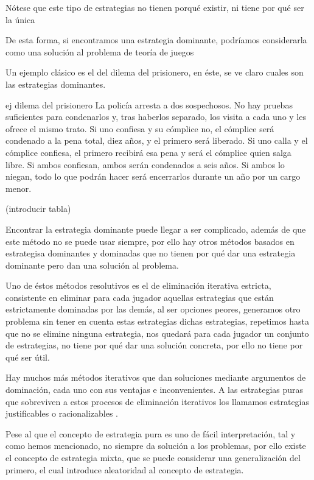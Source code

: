 \documentclass[a4paper]{report} %
\begin{document}
Nótese que este tipo de estrategias no tienen porqué existir, ni tiene por qué ser la única

De esta forma, si encontramos una estrategia dominante, podríamos considerarla como una solución al problema de teoría de juegos

Un ejemplo clásico es el del dilema del prisionero, en éste, se ve claro cuales son las estrategias dominantes.

ej dilema del prisionero
La policía arresta a dos sospechosos. No hay pruebas suficientes para condenarlos y, tras haberlos separado, los visita a cada uno y les ofrece el mismo trato. Si uno confiesa y su cómplice no, el cómplice será condenado a la pena total, diez años, y el primero será liberado. Si uno calla y el cómplice confiesa, el primero recibirá esa pena y será el cómplice quien salga libre. Si ambos confiesan, ambos serán condenados a seis años. Si ambos lo niegan, todo lo que podrán hacer será encerrarlos durante un año por un cargo menor.

(introducir tabla)


Encontrar la estrategia dominante puede llegar a ser complicado, además de que este método no se puede usar siempre, por ello hay otros métodos basados en estrategisa dominantes y dominadas que no tienen por qué dar una estrategia dominante pero dan una solución al problema.

Uno de éstos métodos resolutivos es el de eliminación iterativa estricta, consistente en eliminar para cada jugador aquellas estrategias que están estrictamente dominadas por las demás, al ser opciones peores, generamos otro problema sin tener en cuenta estas estrategias dichas estrategias,  repetimos hasta que no se elimine ninguna estrategia, nos quedará para cada jugador un conjunto de estrategias, no tiene por qué dar una solución concreta, por ello no tiene por qué ser útil.

Hay muchos más métodos iterativos que dan soluciones mediante argumentos de dominación, cada uno con sus ventajas e inconvenientes. A las estrategias  puras que sobreviven a estos procesos de eliminación iterativos los llamamos estrategias justificables o racionalizables .

Pese al que el concepto de estrategia pura es uno de fácil interpretación, tal y como hemos mencionado, no siempre da solución a los problemas, por ello existe el concepto de estrategia mixta, que se puede considerar una generalización del primero, el cual introduce aleatoridad al concepto de estrategia.
\end{document}
